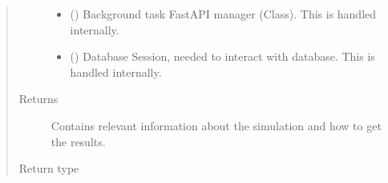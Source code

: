 \documentclass[a4paper,landscape,10pt,english]{sphinxmanual}
\begin{document}
\begin{fulllineitems}
\begin{quote}
\begin{description}
\begin{itemize}
\item {} 
 () \textendash{} Background task FastAPI manager (Class). This is handled internally.

\item {} 
 () \textendash{} Database Session, needed to interact with database. This is handled
internally.

\end{itemize}

\item[{Returns}] \leavevmode
{} \textendash{} Contains relevant information about the simulation and how to get the
results.

\item[{Return type}] \leavevmode
{\hyperref[\detokenize{code_docs/simulation_api.controller:simulation_api.controller.schemas.SimIdResponse}]{}}

\end{description}\end{quote}

\end{fulllineitems}

\end{document}
